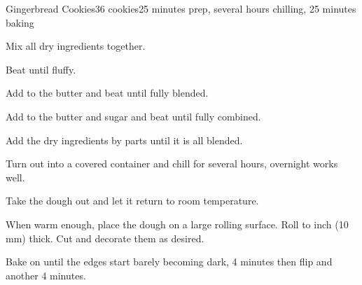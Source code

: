 \documentclass[../Cookbook.tex]{subfiles}
\begin{document}
\begin{recipe}{Gingerbread Cookies}{36 cookies}{25 minutes prep, several hours chilling, 25 minutes baking}

	Mix all dry ingredients together.

	Beat until fluffy.

	Add to the butter and beat until fully blended.

	Add to the butter and sugar and beat until fully combined. 

	Add the dry ingredients by parts until it is all blended.

	Turn out into a covered container and chill for several hours, overnight works well.

	\newstep
	Take the dough out and let it return to room temperature.

	When warm enough, place the dough on a large rolling surface.
	Roll to  inch (10 mm) thick.
	Cut and decorate them as desired.

	\newstep
	Bake on  until the edges start barely becoming dark,
	4 minutes then flip and another 4 minutes.


\end{recipe}
\end{document}
